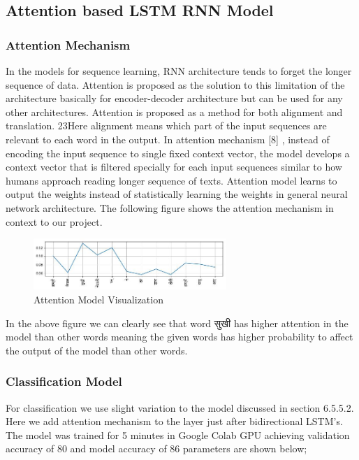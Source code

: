         \subsection{Attention based LSTM RNN Model}
            \subsubsection{Attention Mechanism}
In the models for sequence learning, RNN architecture tends to forget the longer
sequence of data. Attention is proposed as the solution to this limitation of the
architecture basically for encoder-decoder architecture but can be used for any other
architectures. Attention is proposed as a method for both alignment and translation.
23Here alignment means which part of the input sequences are relevant to each word in
the output. In attention mechanism [8] , instead of encoding the input sequence to single
fixed context vector, the model develops a context vector that is filtered specially for
each input sequences similar to how humans approach reading longer sequence of texts.
Attention model learns to output the weights instead of statistically learning the weights
in general neural network architecture. The following figure shows the attention
mechanism in context to our project.

        \begin{figure}[hbt!]
            \centering
                \includegraphics[width=0.65\textwidth]{./img/6.16.jpg}
                \caption{Attention Model Visualization}
        \end{figure}
In the above figure we can clearly see that word सुखी has higher attention in the model
than other words meaning the given words has higher probability to affect the output of
the model than other words.
            \subsubsection{Classification Model}
For classification we use slight variation to the model discussed in section 6.5.5.2. Here
we add attention mechanism to the layer just after bidirectional LSTM’s. The model
was trained for 5 minutes in Google Colab GPU achieving validation accuracy of 80%
and model accuracy of 86%
parameters are shown below;

